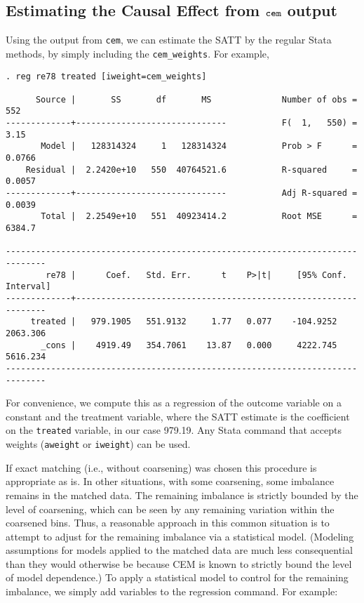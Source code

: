 \documentclass[11pt]{article}
\begin{document}
\subsection{Estimating the Causal Effect from $\tt cem$ output}

Using the output from \texttt{cem}, we can estimate the SATT by the
regular Stata methods, by simply including the \texttt{cem\_weights}. For
example, 

\begin{verbatim}
. reg re78 treated [iweight=cem_weights]

      Source |       SS       df       MS              Number of obs =     552
-------------+------------------------------           F(  1,   550) =    3.15
       Model |   128314324     1   128314324           Prob > F      =  0.0766
    Residual |  2.2420e+10   550  40764521.6           R-squared     =  0.0057
-------------+------------------------------           Adj R-squared =  0.0039
       Total |  2.2549e+10   551  40923414.2           Root MSE      =  6384.7

------------------------------------------------------------------------------
        re78 |      Coef.   Std. Err.      t    P>|t|     [95% Conf. Interval]
-------------+----------------------------------------------------------------
     treated |   979.1905   551.9132     1.77   0.077    -104.9252    2063.306
       _cons |    4919.49   354.7061    13.87   0.000     4222.745    5616.234
------------------------------------------------------------------------------

\end{verbatim}

For convenience, we compute this as a regression of the outcome variable
on a constant and the treatment variable, where the SATT estimate is the
coefficient on the \texttt{treated} variable, in our case 979.19.  Any
Stata command that accepts weights (\texttt{aweight} or
\texttt{iweight}) can be used.

If exact matching (i.e., without coarsening) was chosen this procedure is
appropriate as is.  In other situations, with some coarsening, some
imbalance remains in the matched data.  The remaining imbalance is
strictly bounded by the level of coarsening, which can be seen by any
remaining variation within the coarsened bins.  Thus, a reasonable
approach in this common situation is to attempt to adjust for the
remaining imbalance via a statistical model.  (Modeling assumptions for
models applied to the matched data are much less consequential than they
would otherwise be because CEM is known to strictly bound the level of
model dependence.)  To apply a statistical model to control for the
remaining imbalance, we simply add variables to the regression command.
For example:
\end{document}

